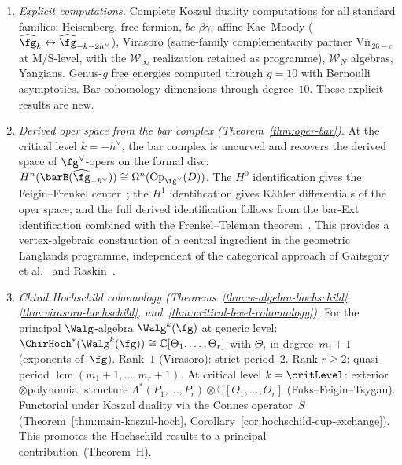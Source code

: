 \begin{enumerate}[label=\emph{(\arabic*)}]
\item \emph{Explicit computations.}
  Complete Koszul duality computations for all standard families:
  Heisenberg, free fermion, $bc$-$\beta\gamma$, affine Kac--Moody
  ($\widehat{\fg}_k \leftrightarrow \widehat{\fg}_{-k-2h^\vee}$),
  Virasoro
  \textup{(}same-family complementarity partner
  $\mathrm{Vir}_{26-c}$ at M/S-level, with the
  $\mathcal{W}_\infty$ realization retained as programme\textup{)},
  $\mathcal{W}_N$ algebras, Yangians.
  Genus-$g$ free energies computed through $g = 10$ with
  Bernoulli asymptotics.  Bar cohomology dimensions through
  degree~$10$.  These explicit results are new.

\item \emph{Derived oper space from the bar complex
  (Theorem~\ref{thm:oper-bar}).}
  At the critical level $k = -h^\vee$, the bar complex is uncurved
  and recovers the derived space of
  $\fg^\vee$-opers on the formal disc:
  $H^n(\barB(\widehat{\fg}_{-h^\vee}))
  \cong \Omega^n(\mathrm{Op}_{\fg^\vee}(D))$.
  The $H^0$ identification gives the Feigin--Frenkel
  center~\cite{Feigin-Frenkel}; the $H^1$ identification
  gives K\"ahler differentials of the oper space; and the
  full derived identification follows from the bar-Ext
  identification combined with the
  Frenkel--Teleman theorem~\cite{FT06}.
  This provides a vertex-algebraic construction of a
  central ingredient in the geometric Langlands programme,
  independent of the categorical approach of
  Gaitsgory et al.~\cite{GLC24} and
  Raskin~\cite{Raskin24}.

\item \emph{Chiral Hochschild cohomology
  (Theorems~\ref{thm:w-algebra-hochschild},
  \ref{thm:virasoro-hochschild},
  and~\ref{thm:critical-level-cohomology}).}
  For the principal $\Walg$-algebra $\Walg^k(\fg)$ at generic level:
  $\ChirHoch^*(\Walg^k(\fg)) \cong \mathbb{C}[\Theta_1, \ldots, \Theta_r]$
  with $\Theta_i$ in degree~$m_i + 1$ (exponents of~$\fg$).
  Rank~$1$ (Virasoro): strict period~$2$.
  Rank $r \geq 2$: quasi-period $\operatorname{lcm}(m_1+1, \ldots, m_r+1)$.
  At critical level $k = \critLevel$:
  exterior$\otimes$polynomial structure
  $\Lambda^*(P_1, \ldots, P_r) \otimes \mathbb{C}[\Theta_1, \ldots, \Theta_r]$
  (Fuks--Feigin--Tsygan).
  Functorial under Koszul duality via the Connes
  operator~$S$ (Theorem~\ref{thm:main-koszul-hoch},
  Corollary~\ref{cor:hochschild-cup-exchange}).
  This promotes the Hochschild results to a
  principal contribution~(Theorem~H).

\end{enumerate}

